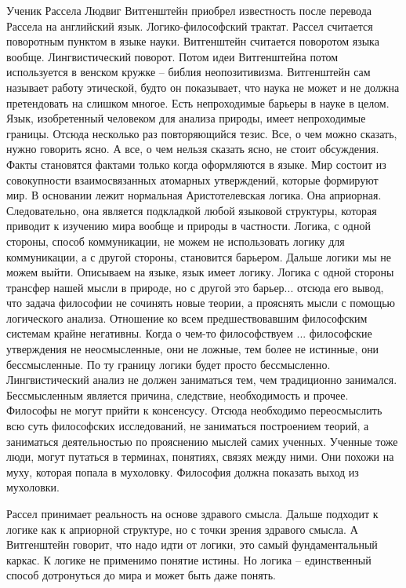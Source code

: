 \documentclass[a4paper, 12pt]{article}
\begin{document}
Ученик Рассела Людвиг Витгенштейн приобрел известность после перевода 
Рассела на английский язык. Логико-философский трактат. Рассел считается 
поворотным пунктом в языке науки. Витгенштейн считается поворотом языка 
вообще. Лингвистический поворот. Потом идеи Витгенштейна потом 
используется в венском кружке -- библия неопозитивизма. Витгенштейн сам 
называет работу этической, будто он показывает, что наука не может и не 
должна претендовать на слишком многое. Есть непроходимые барьеры в науке 
в целом. Язык, изобретенный человеком для анализа природы, имеет 
непроходимые границы. Отсюда несколько раз повторяющийся тезис. Все, 
о чем можно сказать, нужно говорить ясно. А все, о чем нельзя сказать 
ясно, не стоит обсуждения. Факты становятся фактами только когда 
оформляются в языке. Мир состоит из совокупности взаимосвязанных 
атомарных утверждений, которые формируют мир. В основании лежит 
нормальная Аристотелевская логика. Она априорная. Следовательно, она 
является подкладкой любой языковой структуры, которая приводит 
к изучению мира вообще и природы в частности. Логика, с одной стороны, 
способ коммуникации, не можем не использовать логику для коммуникации, 
а с другой стороны, становится барьером. Дальше логики мы не можем 
выйти. Описываем на языке, язык имеет логику. Логика с одной стороны 
трансфер нашей мысли в природе, но с другой это барьер... отсюда его 
вывод, что задача философии не сочинять новые теории, а прояснять мысли 
с помощью логического анализа. Отношение ко всем предшествовавшим 
философским системам крайне негативны. Когда о чем-то философствуем ... 
философские утверждения не неосмысленные, они не ложные, тем более не 
истинные, они бессмысленные. По ту границу логики будет просто 
бессмысленно. Лингвистический анализ не должен заниматься тем, чем 
традиционно занимался. Бессмысленным является причина, следствие, 
необходимость и прочее. Философы не могут прийти к консенсусу. Отсюда 
необходимо переосмыслить всю суть философских исследований, не 
заниматься построением теорий, а заниматься деятельностью по прояснению 
мыслей самих ученных. Ученные тоже люди, могут путаться в терминах, 
понятиях, связях между ними. Они похожи на муху, которая попала 
в мухоловку. Философия должна показать выход из мухоловки.

Рассел принимает реальность на основе здравого смысла. Дальше подходит 
к логике как к априорной структуре, но с точки зрения здравого смысла. 
А Витгенштейн говорит, что надо идти от логики, это самый 
фундаментальный каркас. К логике не применимо понятие истины. Но логика 
-- единственный способ дотронуться до мира и может быть даже понять.
\end{document}
